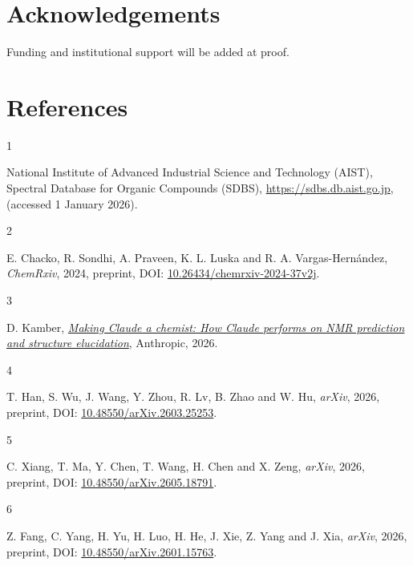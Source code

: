 \documentclass[
  10pt,
]{article}
\newlength{\cslhangindent}
\newlength{\csllabelwidth}
\newlength{\cslentryspacingunit} %
\newenvironment{CSLReferences}[2] %
 {%
  \setlength{\parindent}{0pt}
  \ifodd #1
  \let\oldpar\par
  \def\par{\hangindent=\cslhangindent\oldpar}
  \fi
  \setlength{\parskip}{#2\cslentryspacingunit}
 }%
 {}
\newcommand{\CSLLeftMargin}[1]{\parbox[t]{\csllabelwidth}{#1}}
\newcommand{\CSLRightInline}[1]{\parbox[t]{\linewidth - \csllabelwidth}{#1}\break}
\begin{document}
\FloatBarrier
\hypertarget{acknowledgements}{%
\section{Acknowledgements}\label{acknowledgements}}

Funding and institutional support will be added at proof.

\FloatBarrier
\hypertarget{references}{%
\section{References}\label{references}}

\hypertarget{refs}{}
\begin{CSLReferences}{0}{0}
\leavevmode{}%
\CSLLeftMargin{1 }%
\CSLRightInline{National Institute of Advanced Industrial Science and
Technology (AIST), Spectral Database for Organic Compounds (SDBS),
\url{https://sdbs.db.aist.go.jp}, (accessed 1 January 2026).}

\leavevmode{}%
\CSLLeftMargin{2 }%
\CSLRightInline{E. Chacko, R. Sondhi, A. Praveen, K. L. Luska and R. A.
Vargas-Hernández, \emph{ChemRxiv}, 2024, preprint, DOI:
\href{https://doi.org/10.26434/chemrxiv-2024-37v2j}{10.26434/chemrxiv-2024-37v2j}.}

\leavevmode{}%
\CSLLeftMargin{3 }%
\CSLRightInline{D. Kamber,
\emph{\href{https://anthropic.com/research/making-claude-a-chemist}{Making
Claude a chemist: How Claude performs on NMR prediction and structure
elucidation}}, Anthropic, 2026.}

\leavevmode{}%
\CSLLeftMargin{4 }%
\CSLRightInline{T. Han, S. Wu, J. Wang, Y. Zhou, R. Lv, B. Zhao and W.
Hu, \emph{arXiv}, 2026, preprint, DOI:
\href{https://doi.org/10.48550/arXiv.2603.25253}{10.48550/arXiv.2603.25253}.}

\leavevmode{}%
\CSLLeftMargin{5 }%
\CSLRightInline{C. Xiang, T. Ma, Y. Chen, T. Wang, H. Chen and X. Zeng,
\emph{arXiv}, 2026, preprint, DOI:
\href{https://doi.org/10.48550/arXiv.2605.18791}{10.48550/arXiv.2605.18791}.}

\leavevmode{}%
\CSLLeftMargin{6 }%
\CSLRightInline{Z. Fang, C. Yang, H. Yu, H. Luo, H. He, J. Xie, Z. Yang
and J. Xia, \emph{arXiv}, 2026, preprint, DOI:
\href{https://doi.org/10.48550/arXiv.2601.15763}{10.48550/arXiv.2601.15763}.}


\end{CSLReferences}
\end{document}
